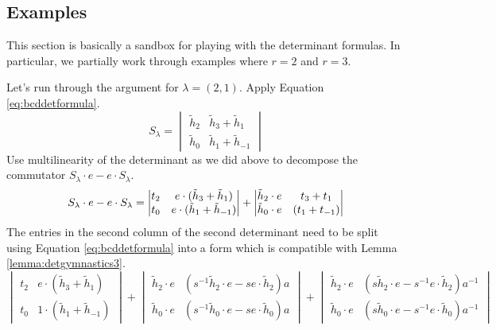 \subsection{Examples}
This section is basically a sandbox for playing with the determinant formulas. In particular, we partially work through examples where $r=2$ and $r=3$. 
\begin{example}
Let's run through the argument for $\lambda = (2, 1)$. Apply Equation \eqref{eq:bcddetformula}.
\[
S_\lambda = 
\begin{vmatrix}
\tilde{h}_2 & \tilde{h}_3 + \tilde{h}_1 \\
\tilde{h}_0 & \tilde{h}_1 + \tilde{h}_{-1}
\end{vmatrix}
\]
Use multilinearity of the determinant as we did above to decompose the commutator $S_\lambda \cdot e - e \cdot S_\lambda$.
\begin{equation*}
S_\lambda \cdot e - e \cdot S_\lambda = 
\begin{vmatrix}
t_2 & e \cdot ( \tilde{h}_3 + \tilde{h}_1 ) \\
t_0 & e \cdot ( \tilde{h}_1 + \tilde{h}_{-1} )
\end{vmatrix}
+
\begin{vmatrix}
\tilde{h}_2 \cdot e & t_3 + t_1 \\
\tilde{h}_0 \cdot e & (t_1 + t_{-1} )
\end{vmatrix} \\
\end{equation*}
The entries in the second column of the second determinant need to be split using Equation \eqref{eq:bcddetformula} into a form which is compatible with Lemma \ref{lemma:detgymnastics3}.
\[
\begin{vmatrix}
t_2 & e \cdot ( \tilde{h}_3 + \tilde{h}_1 ) \\
t_0 & 1 \cdot ( \tilde{h}_1 + \tilde{h}_{-1} )
\end{vmatrix}
+
\begin{vmatrix}
\tilde{h}_2 \cdot e & ( s^{-1} \tilde{h}_2 \cdot e - s e \cdot \tilde{h}_2 ) a \\
\tilde{h}_0 \cdot e & ( s^{-1} \tilde{h}_0 \cdot e - s e \cdot \tilde{h}_0 ) a
\end{vmatrix} 
+
\begin{vmatrix}
\tilde{h}_2 \cdot e & ( s \tilde{h}_2 \cdot e - s^{-1} e \cdot \tilde{h}_2 ) a^{-1} \\
\tilde{h}_0 \cdot e & ( s \tilde{h}_0 \cdot e - s^{-1} e \cdot \tilde{h}_0 ) a^{-1}
\end{vmatrix}
\]
\end{example}
